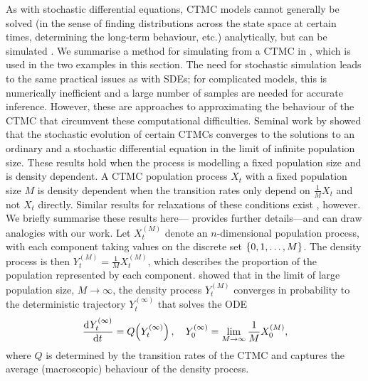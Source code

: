 As with stochastic differential equations, CTMC models cannot generally be solved (in the sense of finding distributions across the state space at certain times, determining the long-term behaviour, etc.) analytically, but can be simulated \citep{Gillespie_1977_ExactStochasticSimulation}.
We summarise a method for simulating from a CTMC in , which is used in the two examples in this section.
The need for stochastic simulation leads to the same practical issues as with SDEs; for complicated models, this is numerically inefficient and a large number of samples are needed for accurate inference.
However, these are approaches to approximating the behaviour of the CTMC that circumvent these computational difficulties.
Seminal work by \citet{Kurtz_1970_SolutionsOrdinaryDifferential,Kurtz_1971_LimitTheoremsSequences} showed that the stochastic evolution of certain CTMCs converges to the solutions to an ordinary and a stochastic differential equation in the limit of infinite population size.
These results hold when the process is modelling a fixed population size and is density dependent.
A CTMC population process \(X_t\) with a fixed population size \(M\) is density dependent when the transition rates only depend on \(\frac1M X_t\) and not \(X_t\) directly.
Similar results for relaxations of these conditions exist \citep{Pollett_1990_ModelInterferenceSearching}, however.
We briefly summarise these results here--- provides further details---and can draw analogies with our work.
Let \(X_t^{(M)}\) denote an \(n\)-dimensional population process, with each component taking values on the discrete set \(\set{0, 1, \dotsc, M}\).
The density process is then \(Y_t^{(M)} = \frac1M X_t^{(M)}\), which describes the proportion of the population represented by each component.
\citet{Kurtz_1970_SolutionsOrdinaryDifferential} showed that in the limit of large population size, \(M \to \infty\), the density process \(Y_t^{(M)}\) converges in probability to the deterministic trajectory \(Y_t^{(\infty)}\) that solves the ODE \citep{Kurtz_1970_SolutionsOrdinaryDifferential}
\begin{equation}\label{eqn:ctmc_ode}
	\dod{Y_t^{(\infty)}}{t} = Q\!\left(Y_t^{(\infty)}\right), \quad Y_0^{(\infty)} = \lim_{M\to\infty}\frac1M X^{(M)}_0,
\end{equation}
where \(Q\) is determined by the transition rates of the CTMC and captures the average (macroscopic) behaviour of the density process.
